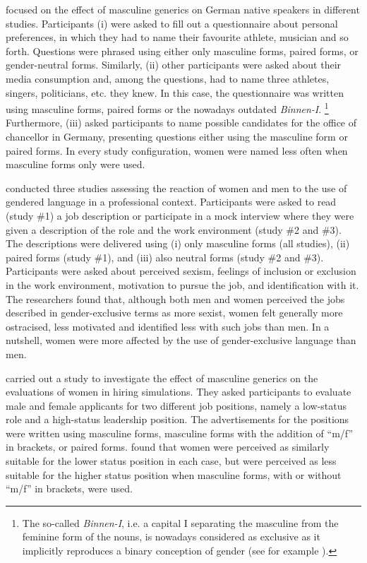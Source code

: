 \textcite{stahlberg2001effekte} focused on the effect of masculine generics on German native speakers in different studies. Participants (i) were asked to fill out a questionnaire about personal preferences, in which they had to name their favourite athlete, musician and so forth. Questions were phrased using either only masculine forms, paired forms, or gender-neutral forms. Similarly, (ii) other participants were asked about their media consumption and, among the questions, had to name three athletes, singers, politicians, etc. they knew. In this case, the questionnaire was written using masculine forms, paired forms or the nowadays outdated \textit{Binnen-I}. \footnote{The so-called \textit{Binnen-I}, i.e. a capital I separating the masculine from the feminine form of the nouns, is nowadays considered as exclusive as it implicitly reproduces a binary conception of gender (see for example \cite[49]{hornscheidt2021wie}).} Furthermore, (iii) \textcite{stahlberg2001effekte} asked participants to name possible candidates for the office of chancellor in Germany, presenting questions either using the masculine form or paired forms. In every study configuration, women were named less often when masculine forms only were used.

\textcite{stout2011he} conducted three studies assessing the reaction of women and men to the use of gendered language in a professional context. Participants were asked to read (study \#1) a job description or participate in a mock interview where they were given a description of the role and the work environment (study \#2 and \#3). The descriptions were delivered using (i) only masculine forms (all studies), (ii) paired forms (study \#1), and (iii) also neutral forms (study \#2 and \#3). Participants were asked about perceived sexism, feelings of inclusion or exclusion in the work environment, motivation to pursue the job, and identification with it. The researchers found that, although both men and women perceived the jobs described in gender-exclusive terms as more sexist, women felt generally more ostracised, less motivated and identified less with such jobs than men. In a nutshell, women were more affected by the use of gender-exclusive language than men.

\textcite{horvath2016reducing} carried out a study to investigate the effect of masculine generics on the evaluations of women in hiring simulations. They asked participants to evaluate male and female applicants for two different job positions, namely a low-status role and a high-status leadership position. The advertisements for the positions were written using masculine forms, masculine forms with the addition of ``m/f'' in brackets, or paired forms. \textcite{horvath2016reducing} found that women were perceived as similarly suitable for the lower status position in each case, but were perceived as less suitable for the higher status position when masculine forms, with or without ``m/f'' in brackets, were used.

